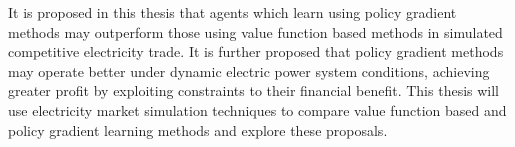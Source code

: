 It is proposed in this thesis that agents which learn using policy gradient
methods may outperform those using value function based methods in simulated
competitive electricity trade.  It is further proposed that policy gradient
methods may operate better under dynamic electric power system conditions,
achieving greater profit by exploiting constraints to their financial benefit.
This thesis will use electricity market simulation techniques to compare value
function based and policy gradient learning methods and explore these
proposals.



%

